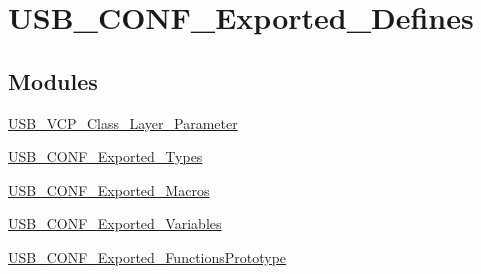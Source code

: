 \hypertarget{group__USB__CONF__Exported__Defines}{\section{U\-S\-B\-\_\-\-C\-O\-N\-F\-\_\-\-Exported\-\_\-\-Defines}
\label{group__USB__CONF__Exported__Defines}
}
\subsection*{Modules}
\begin{DoxyCompactItemize}
\item 
\hyperlink{group__USB__VCP__Class__Layer__Parameter}{U\-S\-B\-\_\-\-V\-C\-P\-\_\-\-Class\-\_\-\-Layer\-\_\-\-Parameter}
\item 
\hyperlink{group__USB__CONF__Exported__Types}{U\-S\-B\-\_\-\-C\-O\-N\-F\-\_\-\-Exported\-\_\-\-Types}
\item 
\hyperlink{group__USB__CONF__Exported__Macros}{U\-S\-B\-\_\-\-C\-O\-N\-F\-\_\-\-Exported\-\_\-\-Macros}
\item 
\hyperlink{group__USB__CONF__Exported__Variables}{U\-S\-B\-\_\-\-C\-O\-N\-F\-\_\-\-Exported\-\_\-\-Variables}
\item 
\hyperlink{group__USB__CONF__Exported__FunctionsPrototype}{U\-S\-B\-\_\-\-C\-O\-N\-F\-\_\-\-Exported\-\_\-\-Functions\-Prototype}
\end{DoxyCompactItemize}
